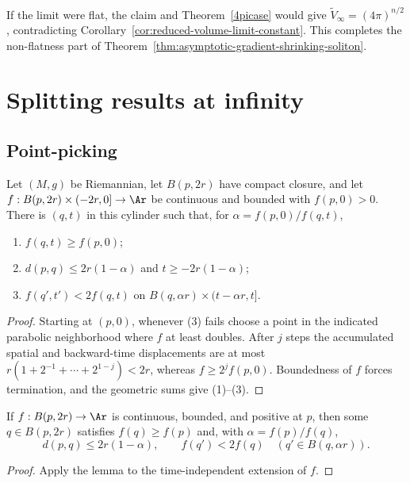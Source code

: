 If the limit were flat, the claim and Theorem~\ref{4picase} would
give $\widetilde V_\infty=(4\pi)^{n/2}$, contradicting
Corollary~\ref{cor:reduced-volume-limit-constant}. This completes the
non-flatness part of Theorem~\ref{thm:asymptotic-gradient-shrinking-soliton}.

\section{Splitting results at infinity}

\subsection{Point-picking}

\begin{lemma}\label{lem:point-picking-general}
\label{4times}
Let $(M,g)$ be Riemannian, let $B(p,2r)$ have compact closure, and
let $f:B(p,2r)\times(-2r,0]\to\Ar$ be continuous and bounded with
$f(p,0)>0$. There is $(q,t)$ in this cylinder such that, for
$\alpha=f(p,0)/f(q,t)$,
\begin{enumerate}
\item[(1)] $f(q,t)\geq f(p,0)$;
\item[(2)] $d(p,q)\leq2r(1-\alpha)$ and
$t\geq-2r(1-\alpha)$;
\item[(3)] $f(q',t')<2f(q,t)$ on
$B(q,\alpha r)\times(t-\alpha r,t]$.
\end{enumerate}
\end{lemma}
\begin{proof}
\sketch Starting at $(p,0)$, whenever (3) fails choose a point in
the indicated parabolic neighborhood where $f$ at least doubles.
After $j$ steps the accumulated spatial and backward-time
displacements are at most
$r(1+2^{-1}+\cdots+2^{1-j})<2r$, whereas $f\geq2^jf(p,0)$.
Boundedness of $f$ forces termination, and the geometric sums give
(1)--(3).
\end{proof}

\begin{corollary}\label{cor:point-picking-time-independent}
\label{pp}
If $f:B(p,2r)\to\Ar$ is continuous, bounded, and positive at $p$,
then some $q\in B(p,2r)$ satisfies $f(q)\geq f(p)$ and, with
$\alpha=f(p)/f(q)$,
\[
 d(p,q)\leq2r(1-\alpha),\qquad
 f(q')<2f(q)\quad(q'\in B(q,\alpha r)).
\]
\end{corollary}
\begin{proof}
\sketch
{}
Apply the lemma to the time-independent extension of $f$.
\end{proof}

